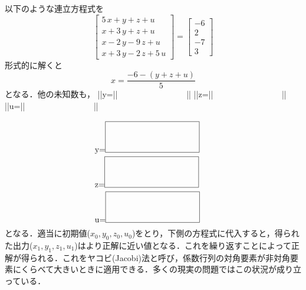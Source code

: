以下のような連立方程式を
\begin{equation*}
\left[ \begin {array}{c} 5\,x+y+z+u\\ x+3\,y+z+u\\ x-2\,y-9\,z+u\\ x+3\,y-2\,z+5\,u\end {array} \right] = \left[ \begin {array}{c} -6\\ 2\\ -7\\ 3\end {array} \right]
\end{equation*}
形式的に解くと
\begin{equation*}
x=\frac{-6-(y+z+u)}{5}
\end{equation*}
となる．他の未知数も，
\ifHIKI
||y=||　　　　　　　　 ||
||z=||　　　　　　　　 ||
||u=||　　　　　　　　 ||
\else
\begin{equation*}
\setlength{\unitlength}{1cm}
\begin{picture}(5,4.5)
\put(0,3.0){y=\framebox(4,1.3){}}
\put(0,1.5){z=\framebox(4,1.3){}}
\put(0,0.0){u=\framebox(4,1.3){}}
\end{picture}
\end{equation*}
\fi
となる．適当に初期値($x_0,y_0,z_0,u_0$)をとり，下側の方程式に代入すると，得られた出力($x_1,y_1,z_1,u_1$)はより正解に近い値となる．これを繰り返すことによって正解が得られる．これをヤコビ(Jacobi)法と呼び，係数行列の対角要素が非対角要素にくらべて大きいときに適用できる．多くの現実の問題ではこの状況が成り立っている．

